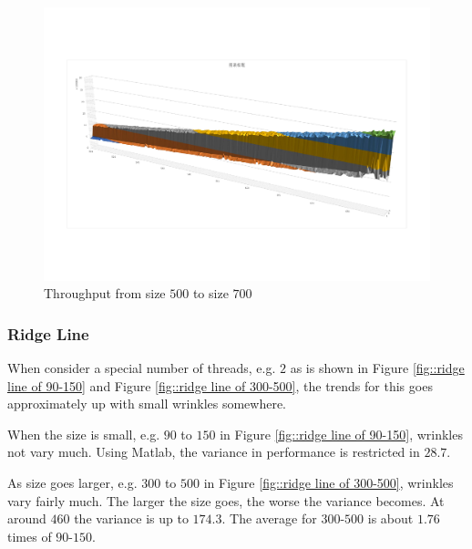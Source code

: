 \documentclass[12pt,a4paper]{article}
\begin{document}
\begin{figure}[H]
	\centering
	\includegraphics[scale= 0.65]{./fig/1_n_thread_500-700.pdf}
	\caption{Throughput from size $500$ to size $700$}
	\label{fig::Throughput of 500-700}
\end{figure}

\subsubsection{Ridge Line}
When consider a special number of threads, e.g. $2$ as is shown in Figure \ref{fig::ridge line of 90-150} and Figure \ref{fig::ridge line of 300-500}, the trends for this goes approximately up with small wrinkles somewhere.

When the size is small, e.g. $90$ to $150$ in Figure \ref{fig::ridge line of 90-150}, wrinkles not vary much. Using Matlab, the variance in performance is restricted in $28.7$.

As size goes larger, e.g. $300$ to $500$ in Figure \ref{fig::ridge line of 300-500}, wrinkles vary fairly much. The larger the size goes, the worse the variance becomes. At around $460$ the variance is up to $174.3$. The average for $300$-$500$ is about $1.76$ times of $90$-$150$.
\end{document}
